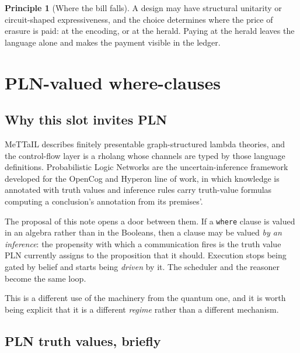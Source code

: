 \documentclass[11pt,a4paper]{article}
\theoremstyle{plain}
\theoremstyle{definition}
\newtheorem{principle}[theorem]{Principle}
\theoremstyle{remark}
\begin{document}
\begin{principle}[Where the bill falls]\label{prin:bill}
A design may have structural unitarity or circuit-shaped expressiveness, and the
choice determines where the price of erasure is paid: at the encoding, or at the
herald. Paying at the herald leaves the language alone and makes the payment
visible in the ledger.
\end{principle}

\section{PLN-valued where-clauses}\label{sec:pln}

\subsection{Why this slot invites PLN}

MeTTaIL describes finitely presentable graph-structured lambda theories, and the
control-flow layer is a rholang whose channels are typed by those language
definitions. Probabilistic Logic Networks are the uncertain-inference framework
developed for the OpenCog and Hyperon line of work, in which knowledge is
annotated with truth values and inference rules carry truth-value formulas
computing a conclusion's annotation from its premises'.

The proposal of this note opens a door between them. If a \texttt{where} clause
is valued in an algebra rather than in the Booleans, then a clause may be valued
\emph{by an inference}: the propensity with which a communication fires is the
truth value PLN currently assigns to the proposition that it should. Execution
stops being gated by belief and starts being \emph{driven} by it. The scheduler
and the reasoner become the same loop.

This is a different use of the machinery from the quantum one, and it is worth
being explicit that it is a different \emph{regime} rather than a different
mechanism.

\subsection{PLN truth values, briefly}
\end{document}
